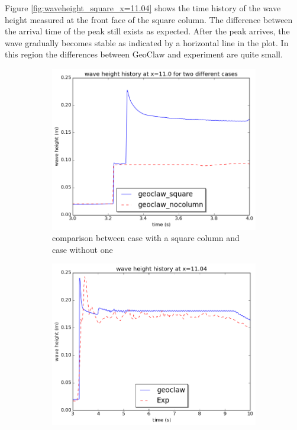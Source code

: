 \documentclass[11pt]{article}
\begin{document}
\par
Figure \ref{fig:waveheight_square_x=11.04} shows the time history of the wave height measured at the front face of the square column. 
The difference between the arrival time of the peak still exists as expected. After the peak arrives, the wave gradually becomes stable as indicated by a horizontal line in the plot. In this region the differences between GeoClaw and experiment are quite small. 
\begin{figure}[h!]
    \centering
    \begin{subfigure}[b]{0.4\textwidth}
        \includegraphics[width=1\textwidth]{./plots/waveheight_x11_comparison}
        \caption{comparison between case with a square column and case without one}
        \label{fig:waveheight_x11_comparison}
    \end{subfigure}
    \begin{subfigure}[b]{0.4\textwidth}
        \includegraphics[width=1\textwidth]{./plots/waveheight_square_x1104_largerTimeRange}

\end{subfigure}
\end{figure}
\end{document}
